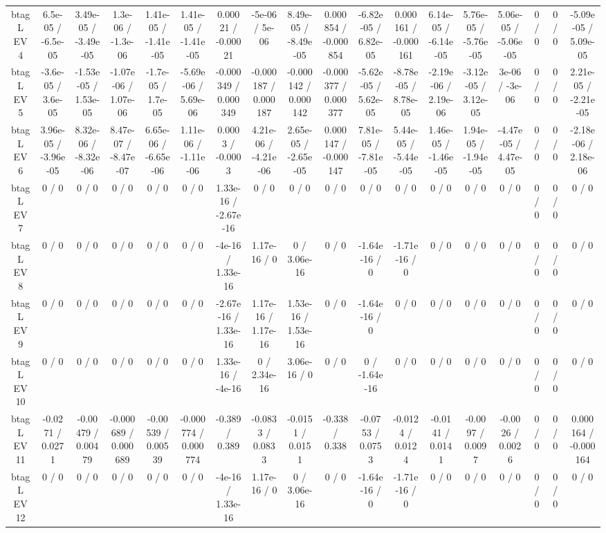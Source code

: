\documentclass[10pt]{article}
\begin{document}
\begin{table}[htbp]
\begin{center}
\begin{tabular}{|c|c|c|c|c|c|c|c|c|c|c|c|c|c|c|c|c|c|}
  btag L EV 4 & 6.5e-05 / -6.5e-05 & 3.49e-05 / -3.49e-05 & 1.3e-06 / -1.3e-06 & 1.41e-05 / -1.41e-05 & 1.41e-05 / -1.41e-05 & 0.00021 / -0.00021 & -5e-06 / 5e-06 & 8.49e-05 / -8.49e-05 & 0.000854 / -0.000854 & -6.82e-05 / 6.82e-05 & 0.000161 / -0.000161 & 6.14e-05 / -6.14e-05 & 5.76e-05 / -5.76e-05 & 5.06e-05 / -5.06e-05 & 0 / 0 & 0 / 0 & -5.09e-05 / 5.09e-05 \\ 
  btag L EV 5 & -3.6e-05 / 3.6e-05 & -1.53e-05 / 1.53e-05 & -1.07e-06 / 1.07e-06 & -1.7e-05 / 1.7e-05 & -5.69e-06 / 5.69e-06 & -0.000349 / 0.000349 & -0.000187 / 0.000187 & -0.000142 / 0.000142 & -0.000377 / 0.000377 & -5.62e-05 / 5.62e-05 & -8.78e-05 / 8.78e-05 & -2.19e-06 / 2.19e-06 & -3.12e-05 / 3.12e-05 & 3e-06 / -3e-06 & 0 / 0 & 0 / 0 & 2.21e-05 / -2.21e-05 \\ 
  btag L EV 6 & 3.96e-05 / -3.96e-05 & 8.32e-06 / -8.32e-06 & 8.47e-07 / -8.47e-07 & 6.65e-06 / -6.65e-06 & 1.11e-06 / -1.11e-06 & 0.0003 / -0.0003 & 4.21e-06 / -4.21e-06 & 2.65e-05 / -2.65e-05 & 0.000147 / -0.000147 & 7.81e-05 / -7.81e-05 & 5.44e-05 / -5.44e-05 & 1.46e-05 / -1.46e-05 & 1.94e-05 / -1.94e-05 & -4.47e-05 / 4.47e-05 & 0 / 0 & 0 / 0 & -2.18e-06 / 2.18e-06 \\ 
  btag L EV 7 & 0 / 0 & 0 / 0 & 0 / 0 & 0 / 0 & 0 / 0 & 1.33e-16 / -2.67e-16 & 0 / 0 & 0 / 0 & 0 / 0 & 0 / 0 & 0 / 0 & 0 / 0 & 0 / 0 & 0 / 0 & 0 / 0 & 0 / 0 & 0 / 0 \\ 
  btag L EV 8 & 0 / 0 & 0 / 0 & 0 / 0 & 0 / 0 & 0 / 0 & -4e-16 / 1.33e-16 & 1.17e-16 / 0 & 0 / 3.06e-16 & 0 / 0 & -1.64e-16 / 0 & -1.71e-16 / 0 & 0 / 0 & 0 / 0 & 0 / 0 & 0 / 0 & 0 / 0 & 0 / 0 \\ 
  btag L EV 9 & 0 / 0 & 0 / 0 & 0 / 0 & 0 / 0 & 0 / 0 & -2.67e-16 / 1.33e-16 & 1.17e-16 / 1.17e-16 & 1.53e-16 / 1.53e-16 & 0 / 0 & -1.64e-16 / 0 & 0 / 0 & 0 / 0 & 0 / 0 & 0 / 0 & 0 / 0 & 0 / 0 & 0 / 0 \\ 
  btag L EV 10 & 0 / 0 & 0 / 0 & 0 / 0 & 0 / 0 & 0 / 0 & 1.33e-16 / -4e-16 & 0 / 2.34e-16 & 3.06e-16 / 0 & 0 / 0 & 0 / -1.64e-16 & 0 / 0 & 0 / 0 & 0 / 0 & 0 / 0 & 0 / 0 & 0 / 0 & 0 / 0 \\ 
  btag L EV 11 & -0.0271 / 0.0271 & -0.00479 / 0.00479 & -0.000689 / 0.000689 & -0.00539 / 0.00539 & -0.000774 / 0.000774 & -0.389 / 0.389 & -0.0833 / 0.0833 & -0.0151 / 0.0151 & -0.338 / 0.338 & -0.0753 / 0.0753 & -0.0124 / 0.0124 & -0.0141 / 0.0141 & -0.0097 / 0.0097 & -0.0026 / 0.0026 & 0 / 0 & 0 / 0 & 0.000164 / -0.000164 \\ 
  btag L EV 12 & 0 / 0 & 0 / 0 & 0 / 0 & 0 / 0 & 0 / 0 & -4e-16 / 1.33e-16 & 1.17e-16 / 0 & 0 / 3.06e-16 & 0 / 0 & -1.64e-16 / 0 & -1.71e-16 / 0 & 0 / 0 & 0 / 0 & 0 / 0 & 0 / 0 & 0 / 0 & 0 / 0 \\ 

\end{tabular}
\end{center}
\end{table}
\end{document}
